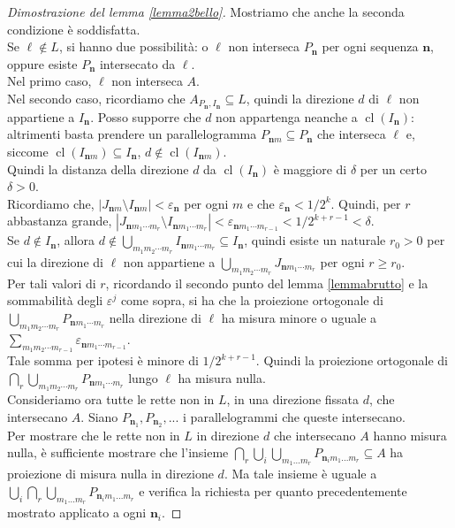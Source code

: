 \documentclass[a4paper, twoside,openright]{article}
\newcommand{\e}{\varepsilon}
\newcommand{\<}{\langle}
\renewcommand{\>}{\rangle}
\begin{document}
\begin{proof}[Dimostrazione del lemma \ref{lemma2bello}]
Mostriamo che anche la seconda condizione è soddisfatta.\\
Se $\ell \notin L$, si hanno due possibilità: o $\ell$ non interseca $P_{\mathbf{n}}$ per ogni sequenza $\mathbf{n}$, oppure esiste $P_\mathbf{n}$ intersecato da $\ell$.\\
Nel primo caso, $\ell$ non interseca $A$.\\
Nel secondo caso, ricordiamo che $A_{P_\mathbf{n},I_\mathbf{n}} \subseteq L$, quindi la direzione $d$ di $\ell$ non appartiene a $I_{\mathbf{n}}$. Posso supporre che $d$ non appartenga neanche a $\operatorname{cl}(I_\mathbf{n})$: altrimenti basta prendere un parallelogramma $P_{\mathbf{n}m} \subseteq P_{\mathbf{n}}$ che interseca $\ell$ e, siccome $\operatorname{cl}(I_{\mathbf{n}m}) \subseteq I_{\mathbf{n}}$, $d \not \in \operatorname{cl}(I_{\mathbf{n}m})$.\\
Quindi la distanza della direzione $d$ da $\operatorname{cl}(I_\mathbf{n})$ è maggiore di $\delta$ per un certo $\delta >0$.\\
Ricordiamo che, $|J_{\mathbf{n}m} \setminus I_{\mathbf{n}m}| < \e_{\mathbf{n}}$ per ogni $m$ e che $\e_{\mathbf{n}} < 1/2^k$. Quindi, per $r$ abbastanza grande, $|J_{\mathbf{n} m_{1} \cdots m_{r}} \setminus I_{\mathbf{n} m_{1} \cdots m_{r}}| < \e_{\mathbf{n} m_{1} \cdots m_{r-1}} < 1/2^{k+r-1}<\delta$.\\
Se $d \not \in I_{\mathbf{n}} $, allora $d \not \in \bigcup_{m_{1} m_{2} \cdots m_{r}} I_{\mathbf{n} m_{1} \cdots m_{r}} \subseteq I_{\mathbf{n}}$, quindi esiste un naturale $r_0 >0$ per cui la direzione di $\ell$ non appartiene a $\bigcup_{m_{1} m_{2} \cdots m_{r}} J_{\mathbf{n} m_{1} \cdots m_{r}}$ per ogni $r \geq r_0$.\\
Per tali valori di $r$, ricordando il secondo punto del lemma \ref{lemmabrutto} e la sommabilità degli $\e^j$ come sopra, si ha che la proiezione ortogonale di $\bigcup_{m_{1} m_{2} \cdots m_{r}} P_{\mathbf{n} m_{1} \cdots m_{r}}$ nella direzione di $\ell$ ha misura minore o uguale a $\sum_{m_{1} m_{2} \cdots m_{r-1}} \varepsilon_{\mathbf{n} m_{1} \cdots m_{r-1}}$.\\
Tale somma per ipotesi è minore di $1/2^{k+r-1}$. Quindi la proiezione ortogonale di $\bigcap_{r} \bigcup_{m_{1} m_{2} \cdots m_{r}} P_{\mathbf{n} m_{1} \cdots m_{r}} $ lungo $\ell$ ha misura nulla.\\
Consideriamo ora tutte le rette non in $L$, in una direzione fissata $d$, che intersecano $A$. Siano $P_{\mathbf{n}_1}, P_{\mathbf{n}_2},...$ i parallelogrammi che queste intersecano.\\
Per mostrare che le rette non in $L$ in direzione $d$ che intersecano $A$ hanno misura nulla, è sufficiente mostrare che l'insieme $\bigcap_r \bigcup_i \bigcup_{m_1 ... m_r}  P_{\mathbf{n}_i m_{1} ...m_{r} } \subseteq A$ ha proiezione di misura nulla in direzione $d$. Ma tale insieme è uguale a $\bigcup_i \bigcap_r \bigcup_{m_1 ... m_r}  P_{\mathbf{n}_i m_{1} ...m_{r} }$ e verifica la richiesta per quanto precedentemente mostrato applicato a ogni $\mathbf{n}_i$.
\end{proof}
\end{document}
